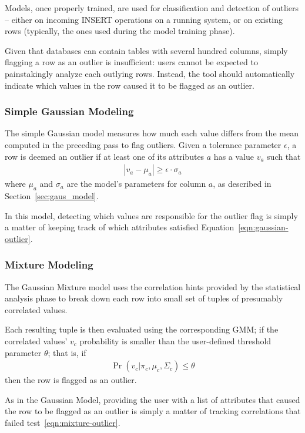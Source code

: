 Models, once properly trained, are used for classification and detection of outliers -- either on incoming INSERT operations on a running system, or on existing rows (typically, the ones used during the model training phase). %

Given that databases can contain tables with several hundred columns, simply flagging a row as an outlier is insufficient: users cannot be expected to painstakingly analyze each outlying rows. Instead, the tool should automatically indicate which values in the row caused it to be flagged as an outlier.

\subsubsection{Simple Gaussian Modeling}
The simple Gaussian model measures how much each value differs from the mean computed in the preceding pass to flag outliers. Given a tolerance parameter $\epsilon$, a row is deemed an outlier if at least one of its attributes $a$ has a value $v_a$ such that 
\begin{align}
  |v_a - \mu_a| \ge \epsilon \cdot \sigma_a
  \label{eqn:gaussian-outlier}
\end{align}
where $\mu_a$ and $\sigma_a$ are the model's parameters for column $a$, as described in Section~\ref{sec:gaus_model}.

In this model, detecting which values are responsible for the outlier flag is simply a matter of keeping track of which attributes satisfied Equation~\ref{eqn:gaussian-outlier}.
 
\subsubsection{Mixture Modeling}
The Gaussian Mixture model uses the correlation hints provided by the statistical analysis phase to break down each row into small set of tuples of presumably correlated values.

Each resulting tuple is then evaluated using the corresponding GMM; if the correlated values' $v_c$ probability is smaller than the user-defined threshold parameter $\theta$; that is, if
\begin{align}
  \Pr(v_c | \pi_c, \mu_c, \Sigma_c) \leq \theta 
  \label{eqn:mixture-outlier}
\end{align}
then the row is flagged as an outlier.

As in the Gaussian Model, providing the user with a list of attributes that caused the row to be flagged as an outlier is simply a matter of tracking correlations that failed test~\ref{eqn:mixture-outlier}.

